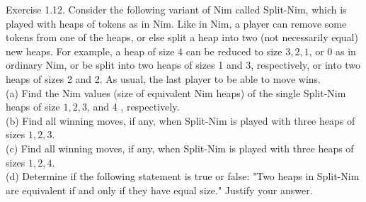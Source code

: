 \documentclass[12pt]{article}
\begin{document}
Exercise 1.12. Consider the following variant of Nim called Split-Nim, which is played with heaps of tokens as in Nim. Like in Nim, a player can remove some tokens from one of the heaps, or else split a heap into two (not necessarily equal) new heaps. For example, a heap of size 4 can be reduced to size $3,2,1$, or 0 as in ordinary Nim, or be split into two heaps of sizes 1 and 3, respectively, or into two heaps of sizes 2 and 2. As usual, the last player to be able to move wins.\\
(a) Find the Nim values (size of equivalent Nim heaps) of the single Split-Nim heaps of size $1,2,3$, and 4 , respectively.\\
(b) Find all winning moves, if any, when Split-Nim is played with three heaps of sizes $1,2,3$.\\
(c) Find all winning moves, if any, when Split-Nim is played with three heaps of sizes $1,2,4$.\\
(d) Determine if the following statement is true or false: "Two heaps in Split-Nim are equivalent if and only if they have equal size." Justify your answer.
\end{document}
